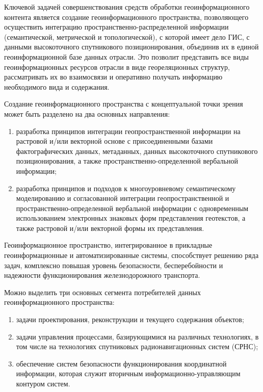 \begin{multicols}{2}
      Ключевой задачей совершенствования средств обработки геоинформационного 
контента является создание геоинформационного пространства, позволяющего 
осуществить интеграцию про\-стран\-ст\-вен\-но-рас\-пре\-де\-лен\-ной информации (семантической, 
метрической и топологической), с которой имеет дело ГИС, с данными высокоточного 
спутникового позиционирования, объединив их в единой геоинформационной базе 
данных отрасли. Это позволит представить все виды геоинформационных ресурсов 
отрасли в виде геореляционных структур, рассматривать их во взаимосвязи и оперативно 
получать информацию необходимого вида и содержания. 
      
      Создание геоинформационного пространства с концептуальной точки зрения 
может быть разделено на два основных направления:
      \begin{enumerate}[(1)]
\item разработка принципов интеграции геопространственной информации на 
растровой и/или векторной основе с присоединенными базами фактографических 
данных, метаданных, данных высокоточного спутникового позиционирования, а также 
пространственно-опре\-де\-лен\-ной вербальной информации;
\item разработка принципов и подходов к многоуровневому семантическому 
моделированию и согласованной интеграции геопространственной и 
пространственно-определенной вербальной информации с одновременным 
использованием электронных знаковых форм представления геотекстов, а также 
растровой и/или векторной формы их представления.
      \end{enumerate}
      
      Геоинформационное пространство, интегрированное в прикладные 
геоинформационные и автоматизированные системы, способствует решению ряда задач, 
комплексно повышая уровень безопасности, бесперебойности и надежности 
функционирования железнодорожного транспорта.
      
      Можно выделить три основных сегмента потребителей данных 
геоинформационного про\-стран\-ства:
\begin{enumerate}[(1)] 
\item  задачи проектирования, 
реконструкции и текущего содержания объектов;
\item задачи управления 
процессами, базирующимися на различных технологиях, в том числе на технологиях 
спутниковых радионавигационных систем (СРНС); 
\item обеспечение сис\-тем безопасности 
функционирования координатной информации, которая служит вторичным 
ин\-фор\-ма\-ци\-он\-но-управ\-ля\-ющим контуром сис\-тем. 
\end{enumerate}
      

\end{multicols}

